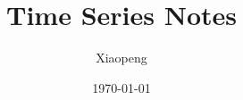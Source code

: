\documentclass[a4paper, 12pt]{article}
\begin{document}
\title{Time Series Notes}
\author{Xiaopeng}
\date{\today}
\maketitle
\end{document}
